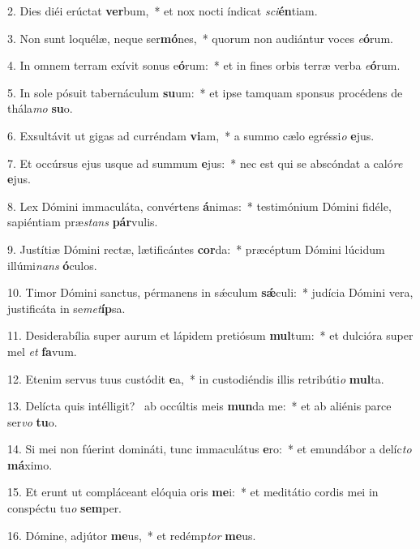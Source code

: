2. Dies diéi erúctat \textbf{ver}bum,~*  et nox nocti índicat \textit{sci}\textbf{én}tiam.\

3. Non sunt loquélæ, neque ser\textbf{mó}nes,~*  quorum non audiántur voces \textit{e}\textbf{ó}rum.\

4. In omnem terram exívit sonus e\textbf{ó}rum:~*  et in fines orbis terræ verba \textit{e}\textbf{ó}rum.\

5. In sole pósuit tabernáculum \textbf{su}um:~*  et ipse tamquam sponsus procédens de thála\textit{mo} \textbf{su}o.\

6. Exsultávit ut gigas ad curréndam \textbf{vi}am,~*  a summo cælo egréssi\textit{o} \textbf{e}jus.\

7. Et occúrsus ejus usque ad summum \textbf{e}jus:~*  nec est qui se abscóndat a caló\textit{re} \textbf{e}jus.\

8. Lex Dómini immaculáta, convértens \textbf{á}nimas:~*  testimónium Dómini fidéle, sapiéntiam præ\textit{stans} \textbf{pár}vulis.\

9. Justítiæ Dómini rectæ, lætificántes \textbf{cor}da:~*  præcéptum Dómini lúcidum illúmi\textit{nans} \textbf{ó}culos.\

10. Timor Dómini sanctus, pérmanens in sǽculum \textbf{sǽ}culi:~*  judícia Dómini vera, justificáta in se\textit{met}\textbf{íp}sa.\

11. Desiderabília super aurum et lápidem pretiósum \textbf{mul}tum:~*  et dulcióra super mel \textit{et} \textbf{fa}vum.\

12. Etenim servus tuus custódit \textbf{e}a,~*  in custodiéndis illis retribúti\textit{o} \textbf{mul}ta.\

13. Delícta quis intélligit? \dag\  ab occúltis meis \textbf{mun}da me:~*  et ab aliénis parce ser\textit{vo} \textbf{tu}o.\

14. Si mei non fúerint domináti, tunc immaculátus \textbf{e}ro:~*  et emundábor a delíc\textit{to} \textbf{má}ximo.\

15. Et erunt ut compláceant elóquia oris \textbf{me}i:~*  et meditátio cordis mei in conspéctu tu\textit{o} \textbf{sem}per.\

16. Dómine, adjútor \textbf{me}us,~*  et redémp\textit{tor} \textbf{me}us.\

